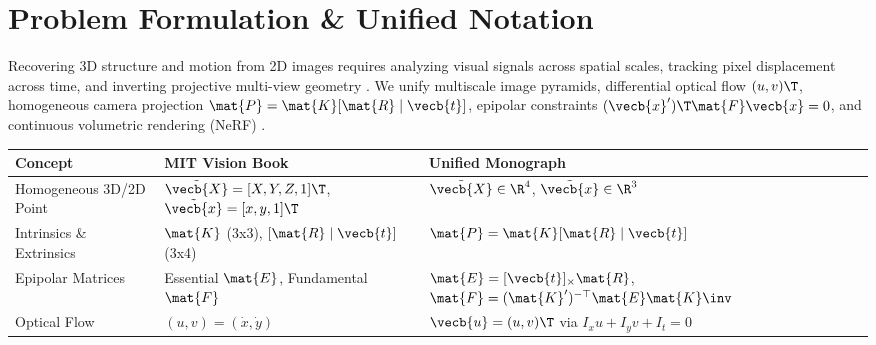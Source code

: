 \documentclass[../../../../master.tex]{subfiles}
\begin{document}

\section{Problem Formulation \& Unified Notation}

Recovering 3D structure and motion from 2D images requires analyzing visual signals across spatial scales, tracking pixel displacement across time, and inverting projective multi-view geometry . We unify multiscale image pyramids, differential optical flow $(u, v)\T$, homogeneous camera projection $\mat{P} = \mat{K}[\mat{R} \mid \vecb{t}]$, epipolar constraints $(\vecb{x}')\T \mat{F} \vecb{x} = 0$, and continuous volumetric rendering (NeRF) .

\begin{crossbook}
\begin{center}
\footnotesize
\begin{tabularx}{\linewidth}{@{} >{\raggedright\arraybackslash}p{2.6cm} >{\raggedright\arraybackslash}X >{\raggedright\arraybackslash}X @{}}
\toprule
\textbf{Concept} & \textbf{MIT Vision Book} & \textbf{Unified Monograph} \\
\midrule
Homogeneous 3D/2D Point & $\tilde{\vecb{X}} = [X,Y,Z,1]\T$, $\tilde{\vecb{x}} = [x,y,1]\T$ & $\tilde{\vecb{X}} \in \R^4$, $\tilde{\vecb{x}} \in \R^3$ \\
Intrinsics \& Extrinsics & $\mat{K}$ (3x3), $[\mat{R} \mid \vecb{t}]$ (3x4) & $\mat{P} = \mat{K}[\mat{R} \mid \vecb{t}]$ \\
Epipolar Matrices & Essential $\mat{E}$, Fundamental $\mat{F}$ & $\mat{E} = [\vecb{t}]_\times \mat{R}$, $\mat{F} = (\mat{K}')^{-\top}\mat{E}\mat{K}\inv$ \\
Optical Flow & $(u, v) = (\dot{x}, \dot{y})$ & $\vecb{u} = (u, v)\T$ via $I_x u + I_y v + I_t = 0$ \\
\bottomrule
\end{tabularx}
\end{center}
\end{crossbook}
\end{document}
